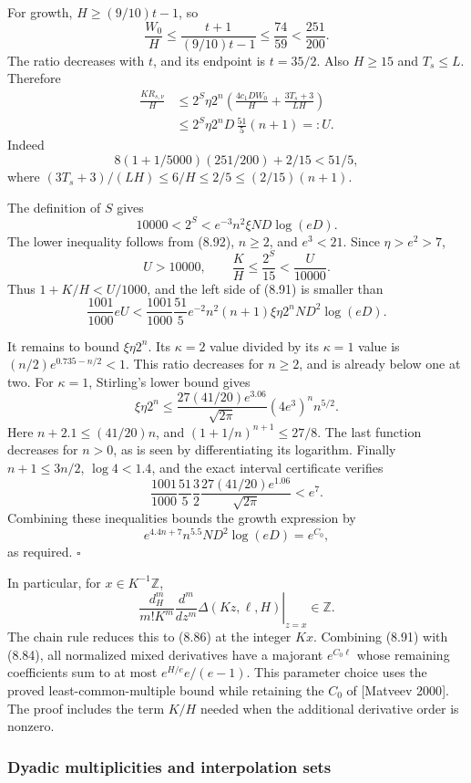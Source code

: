 \documentclass[
  11pt,
  a4paper,
]{article}
\begin{document}
For growth, \(H\ge(9/10)t-1\), so \[
\frac{W_0}{H}\le
\frac{t+1}{(9/10)t-1}
\le\frac{74}{59}<\frac{251}{200}.
\] The ratio decreases with \(t\), and its endpoint is \(t=35/2\). Also
\(H\ge15\) and \(T_s\le L\). Therefore \[
\begin{aligned}
\frac{KR_{s,\nu}}H
&\le2^S\eta2^n
\left(\frac{4c_1DW_0}{H}+\frac{3T_s+3}{LH}\right)\\
&\le2^S\eta2^nD\,\frac{51}{5}(n+1)=:U.
\end{aligned}
\] Indeed \[
8(1+1/5000)(251/200)+2/15<51/5,
\] where \((3T_s+3)/(LH)\le6/H\le2/5
\le(2/15)(n+1)\).

The definition of \(S\) gives \[
10000<2^S<e^{-3}n^2\xi ND\log(eD).
\] The lower inequality follows from (8.92), \(n\ge2\), and \(e^3<21\).
Since \(\eta>e^2>7\), \[
U>10000,\qquad
\frac K H\le\frac{2^S}{15}<\frac U{10000}.
\] Thus \(1+K/H<U/1000\), and the left side of (8.91) is smaller than \[
\frac{1001}{1000}eU
<
\frac{1001}{1000}\frac{51}{5}e^{-2}
n^2(n+1)\xi\eta2^nND^2\log(eD).
\]

It remains to bound \(\xi\eta2^n\). Its \(\kappa=2\) value divided by
its \(\kappa=1\) value is \((n/2)e^{0.735-n/2}<1\). This ratio decreases
for \(n\ge2\), and is already below one at two. For \(\kappa=1\),
Stirling's lower bound gives \[
\xi\eta2^n
\le
\frac{27(41/20)e^{3.06}}{\sqrt{2\pi}}
(4e^3)^n n^{5/2}.
\] Here \(n+2.1\le(41/20)n\), and \((1+1/n)^{n+1}\le27/8\). The last
function decreases for \(n>0\), as is seen by differentiating its
logarithm. Finally \(n+1\le3n/2\), \(\log4<1.4\), and the exact interval
certificate verifies \[
\frac{1001}{1000}\frac{51}{5}\frac32
\frac{27(41/20)e^{1.06}}{\sqrt{2\pi}}<e^7.
\tag{8.93}
\] Combining these inequalities bounds the growth expression by \[
e^{4.4n+7}n^{5.5}ND^2\log(eD)=e^{C_0},
\] as required. \(\square\)

In particular, for \(x\in K^{-1}\mathbb Z\), \[
\left.
\frac{d_H^m}{m!K^m}
\frac{d^m}{dz^m}\Delta(Kz,\ell,H)
\right|_{z=x}\in\mathbb Z.
\] The chain rule reduces this to (8.86) at the integer \(Kx\).
Combining (8.91) with (8.84), all normalized mixed derivatives have a
majorant \(e^{C_0\ell}\) whose remaining coefficients sum to at most
\(e^{H/e}e/(e-1)\). This parameter choice uses the proved
least-common-multiple bound while retaining the \(C_0\) of {[}Matveev
2000{]}. The proof includes the term \(K/H\) needed when the additional
derivative order is nonzero.

\subsubsection{Dyadic multiplicities and interpolation
sets}\label{dyadic-multiplicities-and-interpolation-sets}
\end{document}
